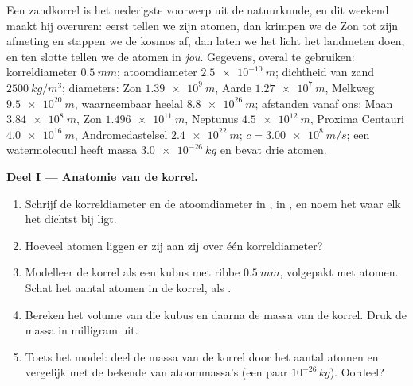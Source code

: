 \begin{problem}
\label{pb:g10:orders-of-magnitude:1}
Een zandkorrel is het nederigste voorwerp uit de natuurkunde, en dit
weekend maakt hij overuren: eerst tellen we zijn atomen, dan krimpen we
de Zon tot zijn afmeting en stappen we de kosmos af, dan laten we het
licht het landmeten doen, en ten slotte tellen we de atomen in
\emph{jou}. Gegevens, overal te gebruiken: korreldiameter
$\qty{0.5}{mm}$; atoomdiameter $\qty{2.5e-10}{m}$; dichtheid van zand
$\qty{2500}{kg/m^3}$; diameters: Zon $\qty{1.39e9}{m}$, Aarde
$\qty{1.27e7}{m}$, Melkweg $\qty{9.5e20}{m}$, waarneembaar heelal
$\qty{8.8e26}{m}$; afstanden vanaf ons: Maan $\qty{3.84e8}{m}$, Zon
$\qty{1.496e11}{m}$, Neptunus $\qty{4.5e12}{m}$, Proxima Centauri
$\qty{4.0e16}{m}$, Andromedastelsel $\qty{2.4e22}{m}$;
$c = \qty{3.00e8}{m/s}$; een watermolecuul heeft massa
$\qty{3.0e-26}{kg}$ en bevat drie atomen.

\medskip
\noindent\textbf{Deel I --- Anatomie van de korrel.}
\begin{enumerate}
  \item Schrijf de korreldiameter en de atoomdiameter in , in
        , en noem het  waar elk
        het dichtst bij ligt.
  \item Hoeveel atomen liggen er zij aan zij over één korreldiameter?
  \item Modelleer de korrel als een kubus met ribbe $\qty{0.5}{mm}$,
        volgepakt met atomen. Schat het aantal atomen in de korrel, als
        .
  \item Bereken het volume van die kubus en daarna de massa van de
        korrel. Druk de massa in milligram uit.
  \item Toets het model: deel de massa van de korrel door het aantal
        atomen en vergelijk met de bekende  van
        atoommassa's (een paar $10^{-26}\,\unit{kg}$). Oordeel?
\end{enumerate}


\end{problem}
